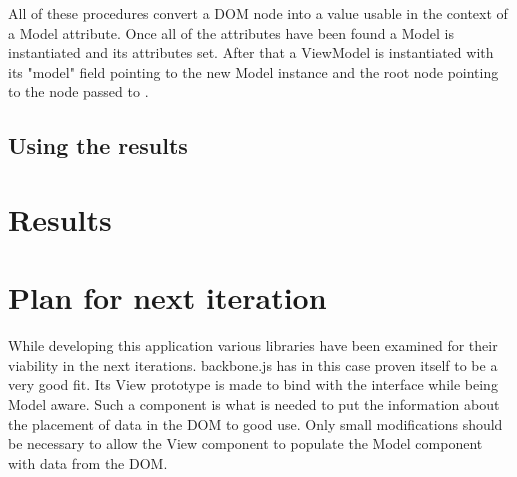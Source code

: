 All of these procedures convert a DOM node into a value usable in the context of
a Model attribute. Once all of the attributes have been found a Model is
instantiated and its attributes set. After that a ViewModel is instantiated with
its "model" field pointing to the new Model instance and the root node pointing
to the node passed to .

\subsection{Using the results}
\section{Results}
\section{Plan for next iteration \todo{\dots}}
While developing this application various libraries have been examined for
their viability in the next iterations. backbone.js has in this case proven
itself to be a very good fit. Its View prototype is made to bind with the
interface while being Model aware. Such a component is what is needed to put the
information about the placement of data in the DOM to good use. Only small
modifications should be necessary to allow the View component to populate the
Model component with data from the DOM.
